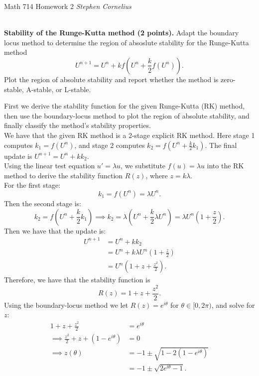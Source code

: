 \documentclass{article}
\begin{document}
\begin{center}
    Math 714
    \hfill Homework 2
    \hfill \textit{Stephen Cornelius}
\end{center}

\begin{problem} \\
    \textbf{Stability of the Runge-Kutta method (2 points).} Adapt the boundary locus method to determine the region of absoslute stability for the Runge-Kutta method 
    \[
        U^{n+1} = U^n + kf\left( U^n + \frac{k}{2}f(U^n) \right).
    \]
    Plot the region of absolute stability and report whether the method is zero-stable, A-stable, or L-stable.
\end{problem}

First we derive the stability function for the given Runge-Kutta (RK) method, then use the boundary-locus method to plot the region of absolute stability, and finally classify the method's stability properties. \\
We have that the given RK method is a 2-stage explicit RK method. Here stage 1 computes $k_1 = f(U^n)$, and stage 2 computes $k_2 = f\left( U^n + \frac{k}{2}k_1 \right)$. The final update is $U^{n+1} = U^n + k k_2$. \\
Using the linear test equation $u' = \lambda u$, we substitute $f(u) = \lambda u$ into the RK method to derive the stability function $R(z)$, where $z = k\lambda$. \\
For the first stage:
\[
  k_1 = f(U^n) = \lambda U^n.
\]
Then the second stage is:
\[
  k_2 = f\left( U^n + \frac{k}{2} k_1 \right) \implies k_2 = \lambda \left( U^n + \frac{k}{2} \lambda U^n \right) = \lambda U^n \left( 1 + \frac{z}{2} \right).
\]
Then we have that the update is:
\begin{align*}
  U^{n+1} &= U^n + k k_2 \\
          &= U^n + k \lambda U^n \left( 1 + \frac{z}{2} \right) \\
          &= U^n \left( 1 + z + \frac{z^2}{2} \right).
\end{align*}
Therefore, we have that the stability function is
\begin{equation}
  R(z) = 1 + z + \frac{z^2}{2}.
\end{equation}
Using the boundary-locus method we let $R(z) = e^{i\theta}$ for $\theta \in [0, 2\pi)$, and solve for $z$:
\begin{align*}
  1 + z + \frac{z^2}{2} &= e^{i\theta} \\
  \implies \frac{z^2}{2} + z + (1 - e^{i\theta}) &= 0 \\
  \implies z(\theta) &= -1 \pm \sqrt{1 - 2(1 - e^{i\theta})} \\
  &= -1 \pm \sqrt{2e^{i\theta} - 1}.
\end{align*}
\end{document}
